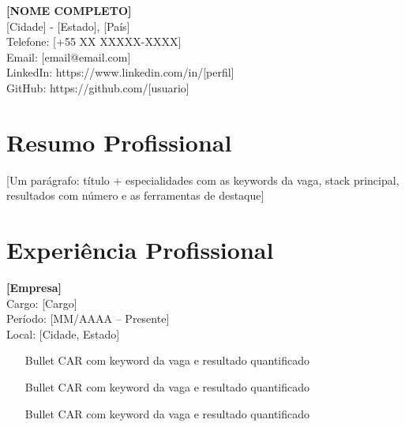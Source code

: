 \documentclass[10pt,a4paper]{article}
\begin{document}

\textbf{\Large [NOME COMPLETO]} \\
[TÍTULO ADAPTADO À VAGA]

[Cidade] - [Estado], [País] \\
Telefone: [+55 XX XXXXX-XXXX] \\
Email: [email@email.com] \\
LinkedIn: https://www.linkedin.com/in/[perfil] \\
GitHub: https://github.com/[usuario]

\section*{Resumo Profissional}

[Um parágrafo: título + especialidades com as keywords da vaga, stack
principal, resultados com número e as ferramentas de destaque]

\section*{Experiência Profissional}

\textbf{[Empresa]} \\
Cargo: [Cargo] \\
Período: [MM/AAAA -- Presente] \\
Local: [Cidade, Estado]

\begin{itemize}
\item [Bullet CAR com keyword da vaga e resultado quantificado]
\item [Bullet CAR com keyword da vaga e resultado quantificado]
\item [Bullet CAR com keyword da vaga e resultado quantificado]
\end{itemize}

\end{document}
